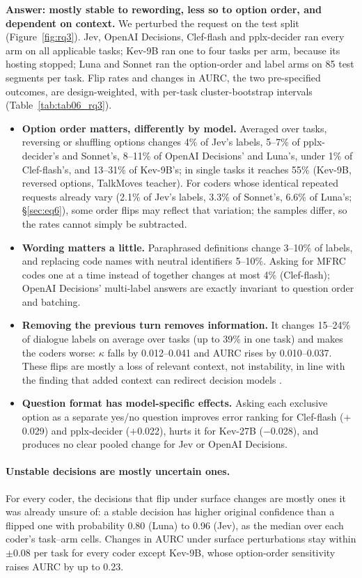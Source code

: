 \textbf{Answer: mostly stable to rewording, less so to option order, and dependent on context.} We perturbed the request on
the test split (Figure~\ref{fig:rq3}). Jev, OpenAI Decisions, Clef-flash and pplx-decider ran every arm on all applicable
tasks; Kev-9B ran one to four tasks per arm, because its hosting stopped; Luna and Sonnet ran the option-order and label arms
on 85 test segments per task. Flip rates and changes in AURC, the two pre-specified outcomes, are design-weighted, with
per-task cluster-bootstrap intervals (Table~\ref{tab:tab06_rq3}).
\begin{itemize}
  \item \textbf{Option order matters, differently by model.} Averaged over tasks, reversing or shuffling options changes 4\%
  of Jev's labels, 5--7\% of pplx-decider's and Sonnet's, 8--11\% of OpenAI Decisions' and Luna's, under 1\% of Clef-flash's,
  and 13--31\% of Kev-9B's; in single tasks it reaches 55\% (Kev-9B, reversed options, TalkMoves teacher). For coders whose
  identical repeated requests already vary (2.1\% of Jev's labels, 3.3\% of Sonnet's, 6.6\% of Luna's; \S\ref{sec:eq6}), some
  order flips may reflect that variation; the samples differ, so the rates cannot simply be subtracted.
  \item \textbf{Wording matters a little.} Paraphrased definitions change 3--10\% of labels, and replacing code names with
  neutral identifiers 5--10\%. Asking for MFRC codes one at a time instead of together changes at most 4\% (Clef-flash);
  OpenAI Decisions' multi-label answers are exactly invariant to question order and batching.
  \item \textbf{Removing the previous turn removes information.} It changes 15--24\% of dialogue labels on average over tasks
  (up to 39\% in one task) and makes the coders worse: $\kappa$ falls by 0.012--0.041 and AURC rises by 0.010--0.037. These
  flips are mostly a loss of relevant context, not instability, in line with the finding that added context can redirect
  decision models \citep{xu2026jevout}.
  \item \textbf{Question format has model-specific effects.} Asking each exclusive option as a separate yes/no question
  improves error ranking for Clef-flash ($+$0.029) and pplx-decider ($+$0.022), hurts it for Kev-27B ($-$0.028), and produces no
  clear pooled change for Jev or OpenAI Decisions.
\end{itemize}

\paragraph{Unstable decisions are mostly uncertain ones.} For every coder, the decisions that flip under surface changes are
mostly ones it was already unsure of: a stable decision has higher original confidence than a flipped one with
probability 0.80 (Luna) to 0.96 (Jev), as the median over each coder's task--arm cells. Changes in AURC under surface
perturbations stay within $\pm$0.08 per task for every coder except Kev-9B, whose option-order sensitivity raises AURC by up
to 0.23.

